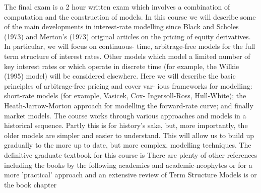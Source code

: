 \documentclass[10pt, oneside, reqno]{amsbook}
\theoremstyle{plain}%
\theoremstyle{definition}
\theoremstyle{rem}
\theoremstyle{definition}
\numberwithin{equation}{chapter}
\begin{document}
The final exam is a 2 hour written exam which involves a combination of computation and the construction of 
models. 
In this course we will describe some of the main developments in interest-rate
modelling since Black and Scholes (1973) and Merton's (1973) original articles
on the pricing of equity derivatives. In particular, we will focus on continuous-
time, arbitrage-free models for the full term structure of interest rates. Other
models which model a limited number of key interest rates or which operate in
discrete time (for example, the Wilkie (1995) model) will be considered elsewhere.
Here we will describe the basic principles of arbitrage-free pricing and cover var-
ious frameworks for modelling: short-rate models (for example, Vasicek, Cox-
Ingersoll-Ross, Hull-White); the Heath-Jarrow-Morton approach for modelling
the forward-rate curve; and finally market models.
The course works through various approaches and models in a historical sequence.
Partly this is for history's sake, but, more importantly, the older models are
simpler and easier to understand. This will allow us to build up gradually to the
more up to date, but more complex, modelling techniques.
The definitive graduate textbook for this course is \cite{filipovic2009term}
There are plenty of other references including the books by the following academics 
and academic-neophytes\cite{TSM_Gibson_1999,IRM_Cairns, 
IRM_Brigo_2001,
FinCalc1996_Baxter,InterestRateDynamics}
or for a more 'practical' approach \cite{TermStructureModels} and an extensive review of Term Structure Models 
is \cite{Riccardo_TSM_Review} or the book chapter \cite{ModernRiskManagement}
\end{document}

